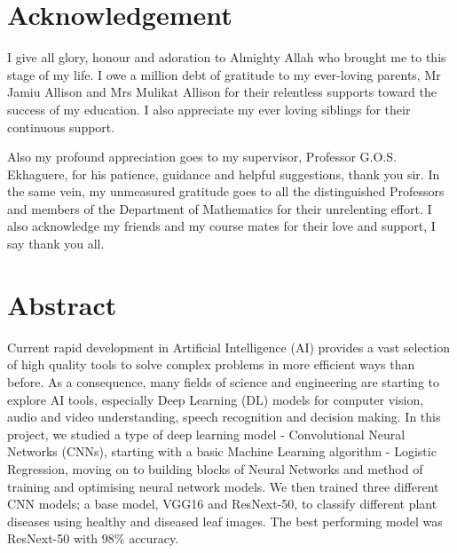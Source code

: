 \documentclass[12pt]{report}
\numberwithin{equation}{section}
\begin{document}
\newpage 
{}
\section*{\centering Acknowledgement}


I give all glory, honour and adoration to Almighty Allah who brought me to this stage of my life. I owe a million debt of gratitude to my ever-loving parents, Mr Jamiu Allison and Mrs Mulikat Allison for their relentless supports toward the success of my education. I also appreciate my ever loving siblings for their continuous support.

Also my profound appreciation goes to my supervisor, Professor G.O.S. Ekhaguere, for his patience, guidance and helpful suggestions, thank you sir. In the same vein, my unmeasured gratitude goes to all the distinguished Professors and members of the Department of Mathematics for their unrelenting effort. I also acknowledge my friends and my course mates for their love and support, I say thank you all.





\newpage
{}
\section*{\centering Abstract}
Current rapid development in Artificial Intelligence (AI) provides a vast selection of high quality tools to solve complex problems in more efficient ways than before. As a consequence, many fields of science and engineering are starting to explore AI tools, especially Deep Learning (DL) models for computer vision, audio and video understanding, speech recognition and decision making. In this project, we studied a type of deep learning model - Convolutional Neural Networks (CNNs), starting with a basic Machine Learning algorithm - Logistic Regression, moving on to building blocks of Neural Networks and method of training and optimising neural network models. We then trained three different CNN models; a base model, VGG16 and ResNext-50, to classify different plant diseases using healthy and diseased leaf images. The best performing model was ResNext-50 with $98\%$ accuracy. 
\end{document}
